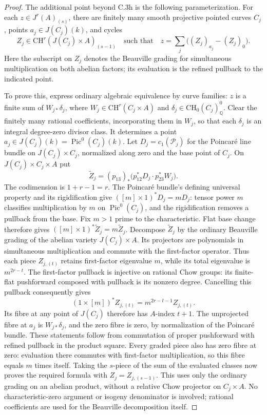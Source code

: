\begin{proof}
The additional point beyond C.3h is the following parameterization.
For each $z\in J^r(A)_{(s)}$, there are finitely many smooth
projective pointed curves $C_j$, points $a_j\in J(C_j)(k)$,
and cycles
\[
 Z_j\in\mathrm{CH}^r(J(C_j)\times A)_{(s-1)}
 \quad\text{such that}\quad
 z=\sum_j\bigl((Z_j)_{a_j}-(Z_j)_0\bigr).
\]
Here the subscript on $Z_j$ denotes the Beauville grading for
simultaneous multiplication on both abelian factors; its
evaluation is the refined pullback to the indicated point.

To prove this, express ordinary algebraic equivalence by curve
families: $z$ is a finite sum of $W_{j*}\delta_j$, where
$W_j\in\mathrm{CH}^r(C_j\times A)$ and
$\delta_j\in\mathrm{CH}_0(C_j)^0_{\mathbb Q}$.
Clear the finitely many rational coefficients, incorporating
them in $W_j$, so that each $\delta_j$ is an integral
degree-zero divisor class. It determines a point
$a_j\in J(C_j)(k)=\operatorname{Pic}^0(C_j)(k)$.
Let $D_j=c_1(\mathcal P_j)$ for the Poincar\'e line bundle on
$J(C_j)\times C_j$, normalized along zero and the base point
of $C_j$. On $J(C_j)\times C_j\times A$ put
\[
 \widetilde Z_j=(p_{13})_*
               \bigl(p_{12}^*D_j\cdot p_{23}^*W_j\bigr).
\]
The codimension is $1+r-1=r$. The Poincar\'e bundle's
defining universal property and its rigidification give
$([m]\times1)^*D_j=mD_j$: tensor power $m$ classifies
multiplication by $m$ on $\operatorname{Pic}^0(C_j)$,
and the rigidification removes a pullback from the base.
Fix $m>1$ prime to the characteristic. Flat base change
therefore gives $([m]\times1)^*\widetilde Z_j=m\widetilde Z_j$.
Decompose $\widetilde Z_j$ by the ordinary Beauville grading
of the abelian variety $J(C_j)\times A$. Its projectors are
polynomials in simultaneous multiplication and commute with
the first-factor operator. Thus each piece $Z_{j,(t)}$
retains first-factor eigenvalue $m$, while its total
eigenvalue is $m^{2r-t}$. The first-factor pullback is
injective on rational Chow groups: its finite-flat
pushforward composed with pullback is its nonzero degree.
Cancelling this pullback consequently gives
\[
 (1\times[m])^*Z_{j,(t)}=m^{2r-t-1}Z_{j,(t)}.
\]
Its fibre at any point of $J(C_j)$ therefore has $A$-index
$t+1$. The unprojected fibre at $a_j$ is $W_{j*}\delta_j$,
and the zero fibre is zero, by normalization of the
Poincar\'e bundle. These statements follow from commutation
of proper pushforward with refined pullback in the product
square. Every graded piece also has zero fibre at zero:
evaluation there commutes with first-factor multiplication,
so this fibre equals $m$ times itself. Taking the $s$-piece
of the sum of the evaluated classes now proves the required
formula with $Z_j=Z_{j,(s-1)}$. This uses only the ordinary
grading on an abelian product, without a relative Chow
projector on $C_j\times A$. No characteristic-zero argument
or isogeny denominator is involved; rational coefficients
are used for the Beauville decomposition itself.


\end{proof}
